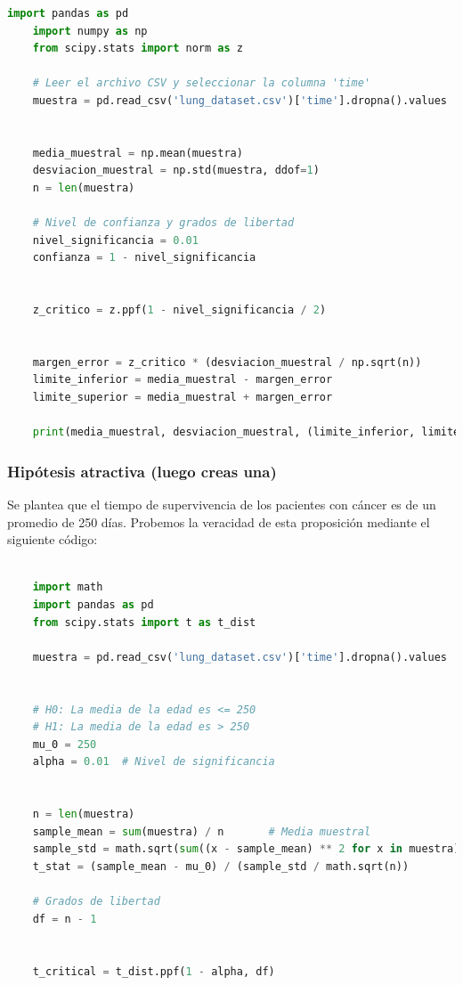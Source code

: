 \documentclass[a4paper,12pt]{article}
\begin{document}
\begin{lstlisting}[language=Python, caption={Código en Python para calcular el intervalo de confianza},label={lst:intervalo_confianza_normal}]
    import pandas as pd
    import numpy as np
    from scipy.stats import norm as z
    
    # Leer el archivo CSV y seleccionar la columna 'time'
    muestra = pd.read_csv('lung_dataset.csv')['time'].dropna().values
    
    
    media_muestral = np.mean(muestra)
    desviacion_muestral = np.std(muestra, ddof=1)
    n = len(muestra)
    
    # Nivel de confianza y grados de libertad
    nivel_significancia = 0.01
    confianza = 1 - nivel_significancia
    

    z_critico = z.ppf(1 - nivel_significancia / 2)
    
    
    margen_error = z_critico * (desviacion_muestral / np.sqrt(n))
    limite_inferior = media_muestral - margen_error
    limite_superior = media_muestral + margen_error
    
    print(media_muestral, desviacion_muestral, (limite_inferior, limite_superior))
    \end{lstlisting}


    \subsubsection*{Hipótesis atractiva (luego creas una)}

    Se plantea que el tiempo de supervivencia de los pacientes con cáncer es de un promedio de 250 días. Probemos la veracidad de esta proposición mediante el siguiente código:

    \begin{lstlisting}[language=Python, caption={Código en Python para calcular el estadígrafo de la prueba de hipotesis},label={3st:prueba_hipotesis_time}]
        
    import math
    import pandas as pd
    from scipy.stats import t as t_dist

    muestra = pd.read_csv('lung_dataset.csv')['time'].dropna().values


    # H0: La media de la edad es <= 250
    # H1: La media de la edad es > 250
    mu_0 = 250  
    alpha = 0.01  # Nivel de significancia


    n = len(muestra)                     
    sample_mean = sum(muestra) / n       # Media muestral
    sample_std = math.sqrt(sum((x - sample_mean) ** 2 for x in muestra) / (n - 1))  
    t_stat = (sample_mean - mu_0) / (sample_std / math.sqrt(n))  

    # Grados de libertad
    df = n - 1


    t_critical = t_dist.ppf(1 - alpha, df)  

    \end{lstlisting}
\end{document}
